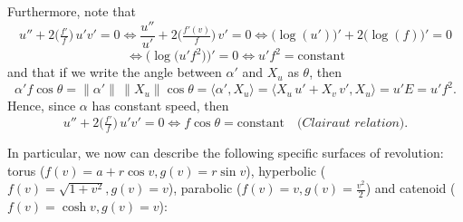 \begin{itemize}
\noindent Furthermore, note that
\[
u'' + 2\big(\tfrac{f'}{f}\big)\,u'v' = 0 \iff \frac{u''}{u'} + 2\big(\tfrac{f'(v)}{f}\big)\,v' = 0 \iff \big(\log(u')\big)' + 2\big(\log(f)\big)' = 0
\]
\[
\iff \Big(\log\big(u'f^2\big)\Big)' = 0 \iff u'f^2 = \mathrm{constant}
\]
and that if we write the angle between $\alpha'$ and $X_u$ as $\theta$, then
\[
\alpha'f\cos\theta = \|\alpha'\|\,\|X_u\|\cos\theta = \big\langle\alpha', X_u\big\rangle = \big\langle X_u\,u' + X_v\,v', X_u\big\rangle = u'E = u'f^2.
\]
Hence, since $\alpha$ has constant speed, then
\[
u'' + 2\big(\tfrac{f'}{f}\big)\,u'v' = 0 \iff f\cos\theta = \mathrm{constant} \quad\big(\textit{Clairaut relation}\big).
\]
\end{itemize}

\noindent In particular, we now can describe the following specific surfaces of revolution: torus ($f(v)=a+r\cos v, g(v)= r\sin v$), hyperbolic ($f(v)= \sqrt{1+v^2} ,g(v)=v$), parabolic ($f(v)= v ,g(v)=\frac{v^2}{2}$) and catenoid ($f(v)=\cosh v ,g(v)=v$):
